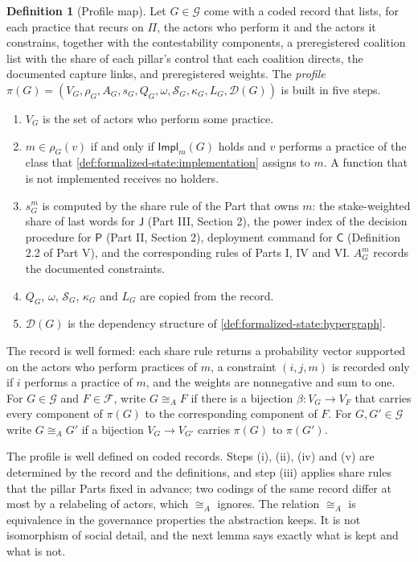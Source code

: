 \documentclass[11pt,letterpaper]{article}
\theoremstyle{definition}
\newtheorem{definition}[theorem]{Definition}
\theoremstyle{remark}
\newcommand{\pP}{\mathsf{P}}
\newcommand{\pJ}{\mathsf{J}}
\newcommand{\pC}{\mathsf{C}}
\newcommand{\Impl}{\mathsf{Impl}}
\begin{document}
\begin{definition}[Profile map]
\label{def:formalized-state:profile}
Let $G\in\mathcal{G}$ come with a coded record that lists, for each practice that recurs on $\Pi$, the actors who perform it and the actors it constrains, together with the contestability components, a preregistered coalition list with the share of each pillar's control that each coalition directs, the documented capture links, and preregistered weights. The \emph{profile} $\pi(G)=(V_G,\rho_G,A_G,s_G,Q_G,\omega,\mathcal{S}_G,\kappa_G,L_G,\mathcal{D}(G))$ is built in five steps.
\begin{enumerate}[label=(\roman*)]
\item $V_G$ is the set of actors who perform some practice.
\item $m\in\rho_G(v)$ if and only if $\Impl_m(G)$ holds and $v$ performs a practice of the class that \cref{def:formalized-state:implementation} assigns to $m$. A function that is not implemented receives no holders.
\item $s^m_G$ is computed by the share rule of the Part that owns $m$: the stake-weighted share of last words for $\pJ$ (Part III, Section 2), the power index of the decision procedure for $\pP$ (Part II, Section 2), deployment command for $\pC$ (Definition 2.2 of Part V), and the corresponding rules of Parts I, IV and VI. $A^m_G$ records the documented constraints.
\item $Q_G$, $\omega$, $\mathcal{S}_G$, $\kappa_G$ and $L_G$ are copied from the record.
\item $\mathcal{D}(G)$ is the dependency structure of \cref{def:formalized-state:hypergraph}.
\end{enumerate}
The record is well formed: each share rule returns a probability vector supported on the actors who perform practices of $m$, a constraint $(i,j,m)$ is recorded only if $i$ performs a practice of $m$, and the weights are nonnegative and sum to one. For $G\in\mathcal{G}$ and $F\in\mathcal{F}$, write $G\cong_AF$ if there is a bijection $\beta:V_G\to V_F$ that carries every component of $\pi(G)$ to the corresponding component of $F$. For $G,G'\in\mathcal{G}$ write $G\cong_AG'$ if a bijection $V_G\to V_{G'}$ carries $\pi(G)$ to $\pi(G')$.
\end{definition}

The profile is well defined on coded records. Steps (i), (ii), (iv) and (v) are determined by the record and the definitions, and step (iii) applies share rules that the pillar Parts fixed in advance; two codings of the same record differ at most by a relabeling of actors, which $\cong_A$ ignores. The relation $\cong_A$ is equivalence in the governance properties the abstraction keeps. It is not isomorphism of social detail, and the next lemma says exactly what is kept and what is not.
\end{document}

